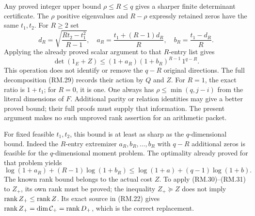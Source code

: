 Any proved integer upper bound $\rho\le R\le q$ gives a sharper
finite determinant certificate. The $\rho$ positive eigenvalues and
$R-\rho$ expressly retained zeros have the same $t_1,t_2$. For $R\ge2$ set
\begin{equation}
 d_R=\sqrt{\frac{Rt_2-t_1^2}{R-1}},\quad
 a_R=\frac{t_1+(R-1)d_R}{R},\quad
 b_R=\frac{t_1-d_R}{R}.\tag{RM.30}
\end{equation}
Applying the already proved scalar argument to that $R$-entry list gives
\begin{equation}
 \det(1_E+Z)\le(1+a_R)(1+b_R)^{R-1}\,1^{q-R}.\tag{RM.31}
\end{equation}
This operation does not identify or remove the $q-R$ original directions.
The full decomposition (RM.29) records their action by $Q$ and $Z$.
For $R=1$, the exact ratio is $1+t_1$; for $R=0$, it is one.
One always has $\rho\le\min(q,j-i)$ from the literal dimensions of $F$.
Additional parity or relation identities may give a better proved bound;
their full proofs must supply that information. The present argument makes
no such unproved rank assertion for an arithmetic packet.

For fixed feasible $t_1,t_2$, this bound is at least as sharp as the
$q$-dimensional bound. Indeed the $R$-entry extremizer
$a_R,b_R,\ldots,b_R$ with $q-R$ additional zeros is feasible for the
$q$-dimensional moment problem. The optimality already proved for that
problem yields
\[
 \log(1+a_R)+(R-1)\log(1+b_R)
 \le\log(1+a)+(q-1)\log(1+b).
\]
The known rank bound belongs to the actual cost $Z$. To apply (RM.30)--(RM.31)
to $Z_+$, its own rank must be proved; the inequality $Z_+\succeq Z$
does not imply $\operatorname{rank} Z_+\le\operatorname{rank} Z$. Its exact source in (RM.22) gives
$\operatorname{rank} Z_+=\dim\mathcal C_+=\operatorname{rank} D_+$, which is the correct replacement.

